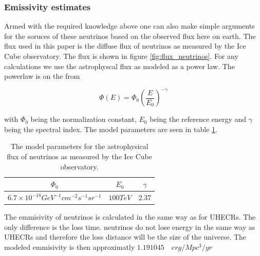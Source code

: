\documentclass{article}
\begin{document}
\subsubsection{Emissivity estimates}

Armed with the required knowledge above one can also make simple arguments for the soruces of these neutrinos based on the observed 
flux here on earth. The flux used in this paper is the diffuse flux of neutrinos as measured by the Ice Cube observatory. The flux is shown in figure \ref{fig:flux_neutrinos}. 
For any calculations we use the astrophyscal flux as modeled as a power law. The powerlaw is on the from 

\begin{equation}
    \Phi(E) = \Phi_0 \left(\frac{E}{E_0}\right)^{-\gamma}
\end{equation}

with $\Phi_0$ being the normalization constant, $E_0$ being the reference energy and $\gamma$ being the spectral index. The model parameters are seen in table \ref{tab:neutrino_flux}.

\begin{table}
    \centering
    \begin{tabular}{|c|c|c|}
        \hline
        $\Phi_0$ & $E_0$ & $\gamma$ \\
        \hline
        $6.7\times 10^{-18} GeV^{-1} cm^{-2} s^{-1} sr^{-1}$ & $100 TeV$ & 2.37 \\
        \hline
    \end{tabular}
    \caption{The model parameters for the astrophysical flux of neutrinos as measured by the Ice Cube observatory.}
    \label{tab:neutrino_flux}
\end{table}

The emmisivity of neutrinos is calculated in the same way as for UHECRs. The only difference is the loss time. neutrinos do not lose energy in the same way as UHECRs and therefore the loss distance will be the size of the universe. 
The modeled emmisivity is then approximatly $1.19 10{45} \quad erg/Mpc^3/yr$
\end{document}
